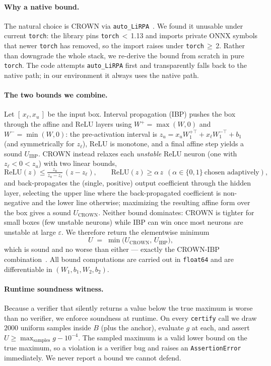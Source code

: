 \paragraph{Why a native bound.}
The natural choice is CROWN via \texttt{auto\_LiRPA}~\cite{xu2020autolirpa,
zhang2018crown}. We found it unusable under current \texttt{torch}: the library
pins \texttt{torch}\,$<$\,1.13 and imports private ONNX symbols that newer
\texttt{torch} has removed, so the import raises under \texttt{torch}\,$\ge$\,2.
Rather than downgrade the whole stack, we re-derive the bound from scratch in pure
\texttt{torch}. The code attempts \texttt{auto\_LiRPA} first and transparently
falls back to the native path; in our environment it always uses the native path.

\paragraph{The two bounds we combine.}
Let $[\,x_\ell, x_u\,]$ be the input box. Interval propagation (IBP) pushes the box
through the affine and ReLU layers using $W^+ = \max(W,0)$ and $W^- = \min(W,0)$:
the pre-activation interval is $z_u = x_u W_1^{+\top} + x_\ell W_1^{-\top} + b_1$
(and symmetrically for $z_\ell$), ReLU is monotone, and a final affine step yields a
sound $U_{\mathrm{IBP}}$. CROWN instead relaxes each \emph{unstable} ReLU neuron
(one with $z_\ell < 0 < z_u$) with two linear bounds,
\[
\mathrm{ReLU}(z) \le \tfrac{z_u}{z_u - z_\ell}\,(z - z_\ell), \qquad
\mathrm{ReLU}(z) \ge \alpha\,z \ \ (\alpha \in \{0,1\}\ \text{chosen adaptively}),
\]
and back-propagates the (single, positive) output coefficient through the hidden
layer, selecting the upper line where the back-propagated coefficient is
non-negative and the lower line otherwise; maximizing the resulting affine form over
the box gives a sound $U_{\mathrm{CROWN}}$. Neither bound dominates: CROWN is
tighter for small boxes (few unstable neurons) while IBP can win once most neurons
are unstable at large $\varepsilon$. We therefore return the elementwise minimum
\[
U \;=\; \min\big(U_{\mathrm{CROWN}},\, U_{\mathrm{IBP}}\big),
\]
which is sound and no worse than either --- exactly the CROWN-IBP
combination~\cite{zhang2020crownibp}. All bound computations are carried out in
\texttt{float64} and are differentiable in $(W_1, b_1, W_2, b_2)$.

\paragraph{Runtime soundness witness.}
Because a verifier that silently returns a value below the true maximum is worse
than no verifier, we enforce soundness at runtime. On every \texttt{certify} call we
draw $2000$ uniform samples inside $B$ (plus the anchor), evaluate $g$ at each, and
assert $U \ge \max_{\text{samples}} g - 10^{-4}$. The sampled maximum is a valid
lower bound on the true maximum, so a violation is a verifier bug and raises an
\texttt{AssertionError} immediately. We never report a bound we cannot defend.

